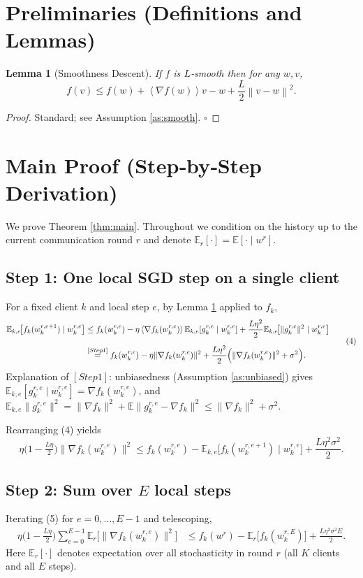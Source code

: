 \documentclass{article}
\newtheorem{lemma}{Lemma}
\newcommand{\EE}{\mathbb{E}}
\newcommand{\norm}[1]{\left\|#1\right\|}
\newcommand{\inner}[1]{\left\langle#1\right\rangle}
\begin{document}
\newpage
\section*{Preliminaries (Definitions and Lemmas)}
\begin{lemma}[Smoothness Descent]\label{lem:smooth}
If $f$ is $L$‑smooth then for any $w,v$,
\[
f(v)\le f(w)+\inner{\nabla f(w)}{v-w}+\frac{L}{2}\norm{v-w}^2 .
\]
\end{lemma}
\begin{proof}
Standard; see Assumption \ref{as:smooth}. \hfill $\square$
\end{proof}

\section*{Main Proof (Step‑by‑Step Derivation)}
We prove Theorem \ref{thm:main}.  Throughout we condition on the history up to the current communication round $r$ and denote $\EE_r[\cdot]=\EE[\cdot\mid w^{r}]$.

\subsection*{Step 1: One local SGD step on a single client}
For a fixed client $k$ and local step $e$, by Lemma \ref{lem:smooth} applied to $f_k$,
\[
\begin{aligned}
\EE_{k,e}\!\bigl[f_k(w_{k}^{r,e+1})\mid w_{k}^{r,e}\bigr]
&\le f_k(w_{k}^{r,e})-\eta\inner{\nabla f_k(w_{k}^{r,e})}{\EE_{k,e}[g_{k}^{r,e}\mid w_{k}^{r,e}]}
   +\frac{L\eta^{2}}{2}\EE_{k,e}\!\bigl[\|g_{k}^{r,e}\|^{2}\mid w_{k}^{r,e}\bigr] \\[2mm]
&\overset{[Step 1]}{=} f_k(w_{k}^{r,e})-\eta\|\nabla f_k(w_{k}^{r,e})\|^{2}
   +\frac{L\eta^{2}}{2}\Bigl(\|\nabla f_k(w_{k}^{r,e})\|^{2}+\sigma^{2}\Bigr) .
\end{aligned}
\tag{4}
\]
Explanation of \([Step 1]\): unbiasedness (Assumption \ref{as:unbiased}) gives
$\EE_{k,e}[g_{k}^{r,e}\mid w_{k}^{r,e}]=\nabla f_k(w_{k}^{r,e})$, and
$\EE_{k,e}\|g_{k}^{r,e}\|^{2}= \|\nabla f_k\|^{2}+\EE\|g_{k}^{r,e}-\nabla f_k\|^{2}
\le \|\nabla f_k\|^{2}+\sigma^{2}$.

Rearranging (4) yields
\[
\eta\bigl(1-\tfrac{L\eta}{2}\bigr)\|\nabla f_k(w_{k}^{r,e})\|^{2}
\le f_k(w_{k}^{r,e})-\EE_{k,e}\!\bigl[f_k(w_{k}^{r,e+1})\mid w_{k}^{r,e}\bigr]
   +\frac{L\eta^{2}\sigma^{2}}{2}.
\tag{5}
\]

\subsection*{Step 2: Sum over $E$ local steps}
Iterating (5) for $e=0,\dots,E-1$ and telescoping,
\[
\begin{aligned}
\eta\bigl(1-\tfrac{L\eta}{2}\bigr)\sum_{e=0}^{E-1}
\EE_{r}\!\bigl[\|\nabla f_k(w_{k}^{r,e})\|^{2}\bigr]
&\le f_k(w^{r})-\EE_{r}\!\bigl[f_k(w_{k}^{r,E})\bigr]
   +\frac{L\eta^{2}\sigma^{2}E}{2}.
\end{aligned}
\tag{6}
\]
Here $\EE_{r}[\cdot]$ denotes expectation over all stochasticity in round $r$ (all $K$ clients and all $E$ steps).
\end{document}
